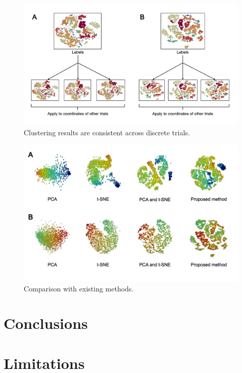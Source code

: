 \documentclass[12pt,oneside,onecolumn,a4paper]{article}
\begin{document}
\begin{figure}[H]
\begin{center}
\includegraphics[width=\columnwidth]{figures/trial_comparison}
\caption{Clustering results are consistent across discrete trials. \label{fig:cross_image_scatter}%
}
\end{center}
\end{figure}

\begin{figure}[H]
\begin{center}
\includegraphics[width=\columnwidth]{figures/dimreduce_comparisons}
\caption{Comparison with existing methods. \label{fig:image_scatter}%
}
\end{center}
\end{figure}

\section{Conclusions}

\section{Limitations}
\end{document}
